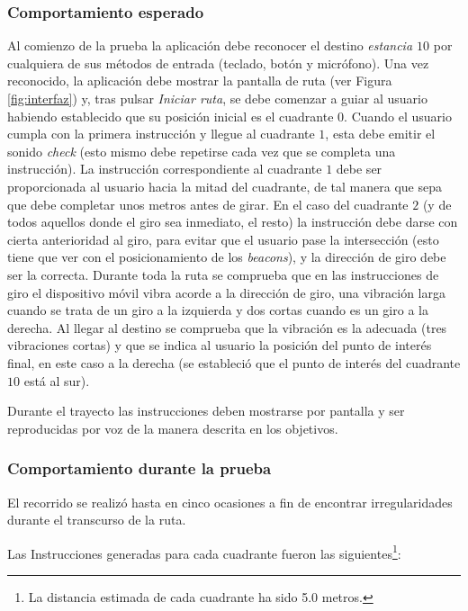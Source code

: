 \subsubsection*{Comportamiento esperado}

Al comienzo de la prueba la aplicación debe reconocer el destino \textit{estancia $10$} por cualquiera de sus métodos de entrada (teclado, botón y micrófono). Una vez reconocido, la aplicación debe mostrar la pantalla de ruta (ver Figura \ref{fig:interfaz}) y, tras pulsar \textit{Iniciar ruta}, se debe comenzar a guiar al usuario habiendo establecido que su posición inicial es el cuadrante $0$. Cuando el usuario cumpla con la primera instrucción y llegue al cuadrante $1$, esta debe emitir el sonido \textit{check} (esto mismo debe repetirse cada vez que se completa una instrucción). La instrucción correspondiente al cuadrante $1$ debe ser proporcionada al usuario hacia la mitad del cuadrante, de tal manera que sepa que debe completar unos metros antes de girar. En el caso del cuadrante $2$ (y de todos aquellos donde el giro sea inmediato, el resto) la instrucción debe darse con cierta anterioridad al giro, para evitar que el usuario pase la intersección (esto tiene que ver con el posicionamiento de los \textit{beacons}), y la dirección de giro debe ser la correcta. Durante toda la ruta se comprueba que en las instrucciones de giro el dispositivo móvil vibra acorde a la dirección de giro, una vibración larga cuando se trata de un giro a la izquierda y dos cortas cuando es un giro a la derecha. Al llegar al destino se comprueba que la vibración es la adecuada (tres vibraciones cortas) y que se indica al usuario la posición del punto de interés final, en este caso a la derecha (se estableció que el punto de interés del cuadrante $10$ está al sur).

Durante el trayecto las instrucciones deben mostrarse por pantalla y ser reproducidas por voz de la manera descrita en los objetivos.

\subsubsection*{Comportamiento durante la prueba}
 
El recorrido se realizó hasta en cinco ocasiones a fin de encontrar irregularidades durante el transcurso de la ruta. 


Las Instrucciones generadas para cada cuadrante fueron las siguientes\footnote{La distancia estimada de cada cuadrante ha sido 5.0 metros.}:

